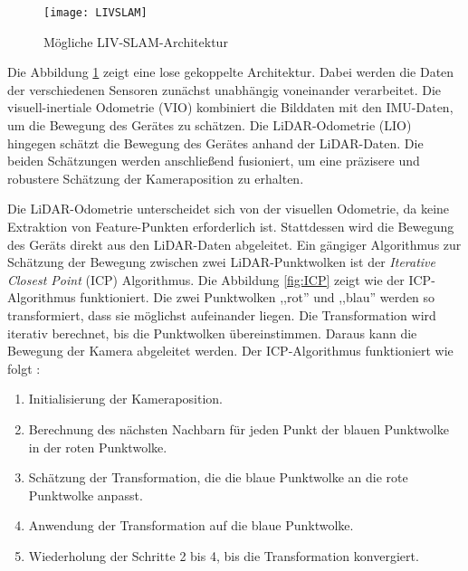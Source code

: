 \begin{figure}
    \centering
    \texttt{[image: LIVSLAM]}
    \caption{Mögliche LIV-SLAM-Architektur \cite{zhang2024lidarslam}\label{fig:LIVSLAM}}\par
\end{figure}

Die Abbildung \ref{fig:LIVSLAM} zeigt eine lose gekoppelte Architektur. Dabei werden die Daten der verschiedenen Sensoren zunächst unabhängig voneinander verarbeitet. Die visuell-inertiale Odometrie (VIO) kombiniert die Bilddaten mit den IMU-Daten, um die Bewegung des Gerätes zu schätzen. Die LiDAR-Odometrie (LIO) hingegen schätzt die Bewegung des Gerätes anhand der LiDAR-Daten. Die beiden Schätzungen werden anschließend fusioniert, um eine präzisere und robustere Schätzung der Kameraposition zu erhalten. \cite{zhang2024lidarslam}

Die LiDAR-Odometrie unterscheidet sich von der visuellen Odometrie, da keine Extraktion von Feature-Punkten erforderlich ist. Stattdessen wird die Bewegung des Geräts direkt aus den LiDAR-Daten abgeleitet. Ein gängiger Algorithmus zur Schätzung der Bewegung zwischen zwei LiDAR-Punktwolken ist der \emph{Iterative Closest Point} (ICP) Algorithmus. Die Abbildung \ref{fig:ICP} zeigt wie der ICP-Algorithmus funktioniert. Die zwei Punktwolken ,,rot'' und ,,blau'' werden so transformiert, dass sie möglichst aufeinander liegen. Die Transformation wird iterativ berechnet, bis die Punktwolken übereinstimmen. Daraus kann die Bewegung der Kamera abgeleitet werden. Der ICP-Algorithmus funktioniert wie folgt \cite{gao2021vSLAM, bogoslavskyi2017icp}:

\begin{enumerate}
    \item Initialisierung der Kameraposition.
    \item Berechnung des nächsten Nachbarn für jeden Punkt der blauen Punktwolke in der roten Punktwolke.
    \item Schätzung der Transformation, die die blaue Punktwolke an die rote Punktwolke anpasst.
    \item Anwendung der Transformation auf die blaue Punktwolke.
    \item Wiederholung der Schritte 2 bis 4, bis die Transformation konvergiert.
\end{enumerate}

